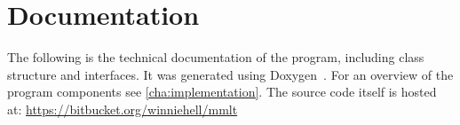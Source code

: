 \chapter{Documentation}
\label{cha:documentation}
The following is the technical documentation of the program, including
class structure and interfaces. It was generated using
Doxygen~\cite{doxygen}. For an overview of the program components see
\cref{cha:implementation}. The source code itself is hosted at:
\url{https://bitbucket.org/winniehell/mmlt}



